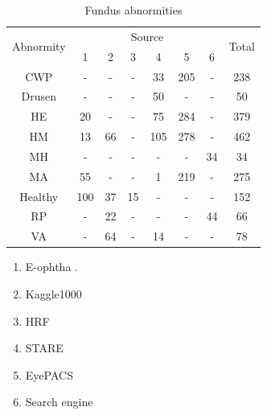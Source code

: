 \documentclass{article}
\begin{document}
	\begin{minipage}[t]{0.6\linewidth}
		{
			\fontsize{9}{12}\selectfont
			{
				\begin{longtable}{cccccccc}
					\caption{Fundus abnormities}
					\label{tb:Fundus_source}\\
					\toprule
					\multirow{2}{*}{Abnormity}&\multicolumn{6}{c}{Source}&\multirow{2}{*}{Total}\\
					&1&2&3&4&5&6&\\
					\midrule
					CWP    &-  &- &- &33 &205&- &238\\
					Drusen &-  &- &- &50 &-  &- &50 \\     
					HE     &20 &- &- &75 &284&- &379\\ 
					HM     &13 &66&- &105&278&- &462\\     
					MH     &-  &- &- &-  &-  &34&34 \\        
					MA     &55 &- &- &1  &219&- &275\\
					Healthy&100&37&15&-  &-  &- &152\\      
					RP     &-  &22&- &-  &-  &44&66 \\         
					VA     &-  &64&- &14 &-  &- &78 \\
					
					\bottomrule
				\end{longtable}
				
				\vspace{1cm}
				\begin{enumerate}[left=1.5cm]
					
					\item E-ophtha \autocite{E_ophtha}.
					\vspace{-0.2cm}
					
					\item Kaggle1000 \autocite{1000Fundus_Pytorch_TransferLearning}
					\vspace{-0.2cm}
					
					\item HRF \autocite{HRF_2013}
					\vspace{-0.2cm}
					
					\item STARE \autocite{STARE}
					\vspace{-0.2cm}
					
					\item EyePACS \autocite{DR_dataset}
					\vspace{-0.2cm}
					
					\item Search engine
					\vspace{-0.2cm}
					
				\end{enumerate}
				
				\vspace{0.5cm}
			}
		}
	\end{minipage}
	
\end{document}
